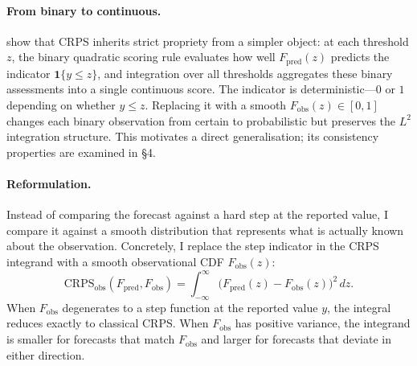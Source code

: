 \paragraph{From binary to continuous.}
\citet{matheson1976scoring} show that CRPS inherits strict propriety from a simpler object: at each threshold $z$, the binary quadratic scoring rule evaluates how well $F_\text{pred}(z)$ predicts the indicator $\mathbf{1}\{y \le z\}$, and integration over all thresholds aggregates these binary assessments into a single continuous score. The indicator is deterministic---$0$ or $1$ depending on whether $y \le z$. Replacing it with a smooth $F_\text{obs}(z) \in [0, 1]$ changes each binary observation from certain to probabilistic but preserves the $L^2$ integration structure. This motivates a direct generalisation; its consistency properties are examined in \S4.

\paragraph{Reformulation.}
Instead of comparing the forecast against a hard step at the reported value, I compare it against a smooth distribution that represents what is actually known about the observation. Concretely, I replace the step indicator in the CRPS integrand with a smooth observational CDF $F_\text{obs}(z)$:
%
\begin{equation}
    \text{CRPS}_\text{obs}(F_\text{pred}, F_\text{obs}) = \int_{-\infty}^{\infty} \bigl( F_\text{pred}(z) - F_\text{obs}(z) \bigr)^2 \, dz.
    \label{eq:fuzzy_crps}
\end{equation}
%
When $F_\text{obs}$ degenerates to a step function at the reported value $y$, the integral reduces exactly to classical CRPS. When $F_\text{obs}$ has positive variance, the integrand is smaller for forecasts that match $F_\text{obs}$ and larger for forecasts that deviate in either direction.

